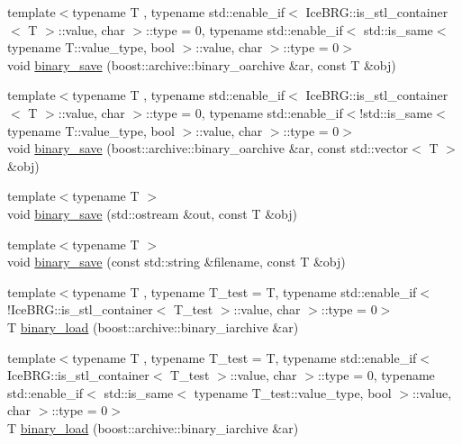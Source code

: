 \begin{DoxyCompactItemize}
\item 
{\footnotesize template$<$typename T , typename std\-::enable\-\_\-if$<$ Ice\-B\-R\-G\-::is\-\_\-stl\-\_\-container$<$ T $>$\-::value, char $>$\-::type  = 0, typename std\-::enable\-\_\-if$<$ std\-::is\-\_\-same$<$ typename T\-::value\-\_\-type, bool $>$\-::value, char $>$\-::type  = 0$>$ }\\void \hyperlink{namespaceIceBRG_aa9f1e3e52dfe4499a3c67814bed947bf}{binary\-\_\-save} (boost\-::archive\-::binary\-\_\-oarchive \&ar, const T \&obj)
\item 
{\footnotesize template$<$typename T , typename std\-::enable\-\_\-if$<$ Ice\-B\-R\-G\-::is\-\_\-stl\-\_\-container$<$ T $>$\-::value, char $>$\-::type  = 0, typename std\-::enable\-\_\-if$<$!std\-::is\-\_\-same$<$ typename T\-::value\-\_\-type, bool $>$\-::value, char $>$\-::type  = 0$>$ }\\void \hyperlink{namespaceIceBRG_abce0217603974a82ebb98e0b8064b156}{binary\-\_\-save} (boost\-::archive\-::binary\-\_\-oarchive \&ar, const std\-::vector$<$ T $>$ \&obj)
\item 
{\footnotesize template$<$typename T $>$ }\\void \hyperlink{namespaceIceBRG_a3597c081ff5001c7b440f80f0ff5b8ef}{binary\-\_\-save} (std\-::ostream \&out, const T \&obj)
\item 
{\footnotesize template$<$typename T $>$ }\\void \hyperlink{namespaceIceBRG_a13f20aa9889ffb60ebedbc7ed93190d8}{binary\-\_\-save} (const std\-::string \&filename, const T \&obj)
\item 
{\footnotesize template$<$typename T , typename T\-\_\-test  = T, typename std\-::enable\-\_\-if$<$!\-Ice\-B\-R\-G\-::is\-\_\-stl\-\_\-container$<$ T\-\_\-test $>$\-::value, char $>$\-::type  = 0$>$ }\\T \hyperlink{namespaceIceBRG_a549b45e1c2a20ce0d322078b362703f6}{binary\-\_\-load} (boost\-::archive\-::binary\-\_\-iarchive \&ar)
\item 
{\footnotesize template$<$typename T , typename T\-\_\-test  = T, typename std\-::enable\-\_\-if$<$ Ice\-B\-R\-G\-::is\-\_\-stl\-\_\-container$<$ T\-\_\-test $>$\-::value, char $>$\-::type  = 0, typename std\-::enable\-\_\-if$<$ std\-::is\-\_\-same$<$ typename T\-\_\-test\-::value\-\_\-type, bool $>$\-::value, char $>$\-::type  = 0$>$ }\\T \hyperlink{namespaceIceBRG_ab7ff0ea3712ba0c10f1bb6c53ce5cf38}{binary\-\_\-load} (boost\-::archive\-::binary\-\_\-iarchive \&ar)
\item 

\end{DoxyCompactItemize}
